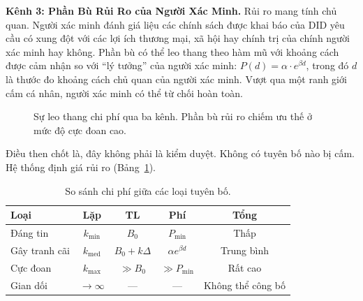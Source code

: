 \documentclass[11pt,a4paper,twocolumn]{article}
\begin{document}
\textbf{Kênh 3: Phần Bù Rủi Ro của Người Xác Minh.} Rủi ro mang tính chủ quan. Người xác minh đánh giá liệu các chính sách được khai báo của DID yêu cầu có xung đột với các lợi ích thương mại, xã hội hay chính trị của chính người xác minh hay không. Phần bù có thể leo thang theo hàm mũ với khoảng cách được cảm nhận so với ``lý tưởng'' của người xác minh: $P(d) = \alpha \cdot e^{\beta d}$, trong đó $d$ là thước đo khoảng cách chủ quan của người xác minh. Vượt qua một ranh giới cấm cá nhân, người xác minh có thể từ chối hoàn toàn.

\begin{figure}[ht]
\centering
{}
\caption{Sự leo thang chi phí qua ba kênh. Phần bù rủi ro chiếm ưu thế ở mức độ cực đoan cao.}
\label{fig:radicalism}
\end{figure}

Điều then chốt là, đây không phải là kiểm duyệt. Không có tuyên bố nào bị cấm. Hệ thống định giá rủi ro (Bảng~\ref{tab:costs}).

\begin{table}[ht]
\centering
\caption{So sánh chi phí giữa các loại tuyên bố.}
\label{tab:costs}
\footnotesize
\begin{tabular}{@{}lcccc@{}}
\toprule
\textbf{Loại} & \textbf{Lặp} & \textbf{TL} & \textbf{Phí} & \textbf{Tổng} \\
\midrule
Đáng tin & $k_{\min}$ & $B_0$ & $P_{\min}$ & Thấp \\
Gây tranh cãi & $k_{\text{med}}$ & $B_0{+}k\Delta$ & $\alpha e^{\beta d}$ & Trung bình \\
Cực đoan & $k_{\max}$ & $\gg B_0$ & $\gg P_{\min}$ & Rất cao \\
Gian dối & $\to\infty$ & --- & --- & Không thể công bố \\
\bottomrule
\end{tabular}
\end{table}
\end{document}
